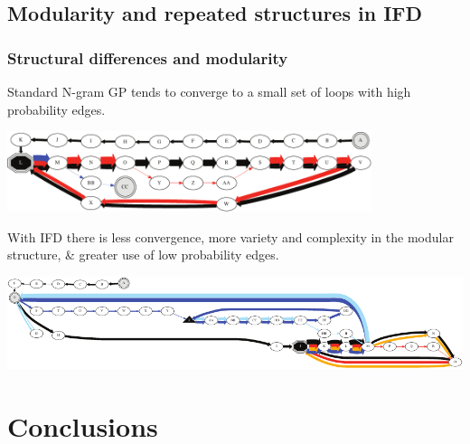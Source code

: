\documentclass{beamer}
\begin{document}
\subsection[Modularity]{Modularity and repeated structures in IFD}

\begin{frame}
  \frametitle{Structural differences and modularity}
  
  Standard N-gram GP tends to converge to a small set of loops with high probability edges.

  \begin{center}
  \includegraphics[width=0.8\textwidth]{duplication_graph_40068231_trimmed_smallNodes_coloredEdges_crop.pdf}
  \end{center}
  
      With IFD there is less convergence, more variety and complexity in the modular structure, \& greater use of low probability edges.
  
  \begin{center}
    \includegraphics[width=\textwidth]{duplication_graph_12454239_trimmed_smallNodes_coloredEdges_crop.pdf}
    \end{center}

\end{frame}

\section[Conclusions]{Conclusions}
\end{document}
